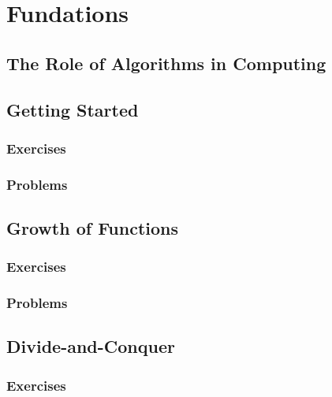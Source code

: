 \documentclass[a4paper, 11pt, fleqn]{report}
\begin{document}
    \tableofcontents
    \part{Fundations}
        \chapter{The Role of Algorithms in Computing}

        \chapter{Getting Started}
            \section*{Exercises}
                
                
                
            \section*{Problems}
                
                
                
                
        \chapter{Growth of Functions}
            \section*{Exercises}
                
                
            \section*{Problems}
                
                
        \chapter{Divide-and-Conquer}
            \section*{Exercises}
                
                
                
                
\end{document}
